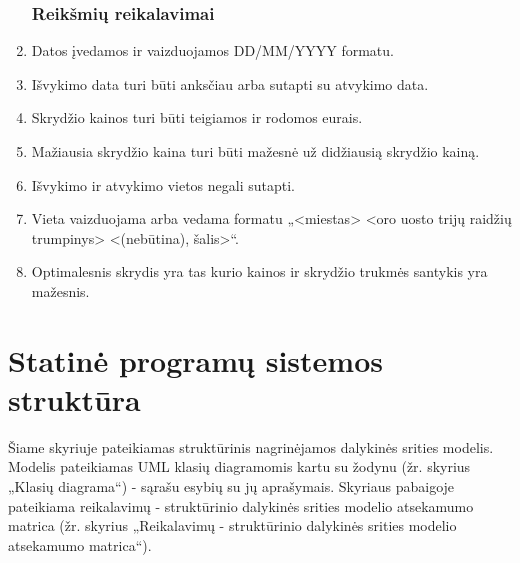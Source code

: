 \documentclass{VUMIFPSkursinis}
\begin{document}
\begin{enumerate}[label=\textbf{NFR\arabic*}.]
					\subsubsection{Reikšmių reikalavimai}
                    	\item Datos įvedamos ir vaizduojamos DD/MM/YYYY formatu.
                    	\item Išvykimo data turi būti anksčiau arba sutapti su atvykimo data.
                    	\item Skrydžio kainos turi būti teigiamos ir rodomos eurais.
                    	\item Mažiausia skrydžio kaina turi būti mažesnė už didžiausią skrydžio kainą.
                    	\item Išvykimo ir atvykimo vietos negali sutapti.
                    	\item Vieta vaizduojama arba vedama formatu „<miestas> <oro uosto trijų raidžių trumpinys> <(nebūtina), šalis>“.
                    	\item \label{optimalus} Optimalesnis skrydis yra tas kurio kainos ir skrydžio trukmės santykis yra mažesnis.
                \end{enumerate}
      
        \section{Statinė programų sistemos struktūra}
            Šiame skyriuje pateikiamas struktūrinis nagrinėjamos dalykinės srities modelis. Modelis pateikiamas UML klasių diagramomis kartu su žodynu (žr. skyrius „Klasių diagrama“) - sąrašu esybių su jų aprašymais. Skyriaus pabaigoje pateikiama reikalavimų - struktūrinio dalykinės srities modelio atsekamumo matrica (žr. skyrius „Reikalavimų - struktūrinio dalykinės srities modelio atsekamumo matrica“).
\end{document}
